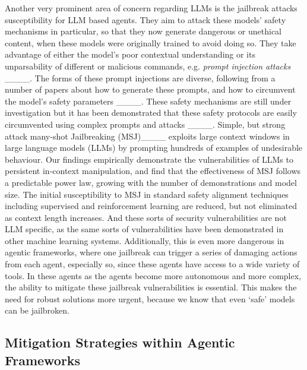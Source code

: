 Another very prominent area of concern regarding LLMs is the jailbreak attacks susceptibility for LLM based agents. They aim to attack these models' safety mechanisms in particular, so that they now generate dangerous or unethical content, when these models were originally trained to avoid doing so. They take advantage of either the model's poor contextual understanding or its unparsability of different or malicious commands, e.g. \emph{prompt injection attacks} ____. The forms of these prompt injections are diverse, following from a number of papers about how to generate these prompts, and how to circumvent the model's safety parameters ____. These safety mechanisms are still under investigation but it has been demonstrated that these safety protocols are easily circumvented using complex prompts and attacks ____. Simple, but strong attack many-shot Jailbreaking (MSJ)____ exploits large context windows in large language models (LLMs) by prompting hundreds of examples of undesirable behaviour. Our findings empirically demonstrate the vulnerabilities of LLMs to persistent in-context manipulation, and find that the effectiveness of MSJ follows a predictable power law, growing with the number of demonstrations and model size. The initial susceptibility to MSJ in standard safety alignment techniques including supervised and reinforcement learning are reduced, but not eliminated as context length increases. And these sorts of security vulnerabilities are not LLM specific, as the same sorts of vulnerabilities have been demonstrated in other machine learning systems. Additionally, this is even more dangerous in agentic frameworks, where one jailbreak can trigger a series of damaging actions from each agent, especially so, since these agents have access to a wide variety of tools. In these agents as the agents become more autonomous and more complex, the ability to mitigate these jailbreak vulnerabilities is essential. This makes the need for robust solutions more urgent, because we know that even ‘safe’ models can be jailbroken.

\subsection{Mitigation Strategies within Agentic Frameworks}

